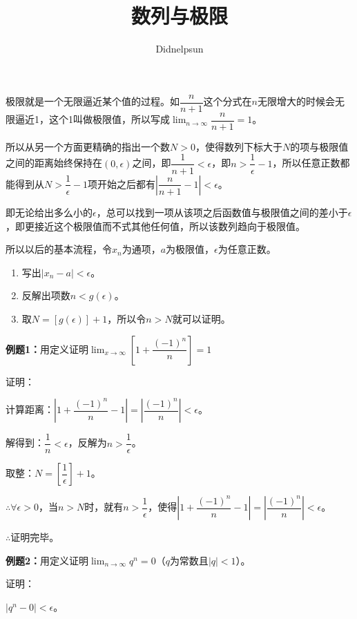 \documentclass[UTF8]{ctexart}
\author{Didnelpsun}
\title{数列与极限}
\date{}
\begin{document}
\maketitle
\thispagestyle{empty}
\tableofcontents
\thispagestyle{empty}
\newpage
\pagestyle{plain}
\setcounter{page}{1}

极限就是一个无限逼近某个值的过程。如$\dfrac{n}{n+1}$这个分式在$n$无限增大的时候会无限逼近1，这个1叫做极限值，所以写成$\lim_{n\to\infty}\dfrac{n}{n+1}=1$。

所以从另一个方面更精确的指出一个数$N>0$，使得数列下标大于$N$的项与极限值之间的距离始终保持在$(0,\epsilon)$之间，即$\dfrac{1}{n+1}<\epsilon$，即$n>\dfrac{1}{\epsilon}-1$，所以任意正数都能得到从$N>\dfrac{1}{\epsilon}-1$项开始之后都有$\left\vert\dfrac{n}{n+1}-1\right\vert<\epsilon$。

即无论给出多么小的$\epsilon$，总可以找到一项从该项之后函数值与极限值之间的差小于$\epsilon$，即更接近这个极限值而不式其他任何值，所以该数列趋向于极限值。

所以以后的基本流程，令$x_n$为通项，$a$为极限值，$\epsilon$为任意正数。

\begin{enumerate}
    \item 写出$\vert x_n-a|<\epsilon$。
    \item 反解出项数$n<g(\epsilon)$。
    \item 取$N=[g(\epsilon)]+1$，所以令$n>N$就可以证明。
\end{enumerate}

\textbf{例题1：}用定义证明$\lim_{x\to\infty}\left[1+\dfrac{(-1)^n}{n}\right]=1$

证明：

计算距离：$\left\vert 1+\dfrac{(-1)^n}{n}-1\right\vert=\left\vert\dfrac{(-1)^n}{n}\right\vert<\epsilon$。

解得到：$\dfrac{1}{n}<\epsilon$，反解为$n>\dfrac{1}{\epsilon}$。

取整：$N=\left[\dfrac{1}{\epsilon}\right]+1$。

$\therefore\forall\epsilon>0$，当$n>N$时，就有$n>\dfrac{1}{\epsilon}$，使得$\left\vert 1+\dfrac{(-1)^n}{n}-1\right\vert=\left\vert\dfrac{(-1)^n}{n}\right\vert<\epsilon$。

$\therefore$证明完毕。

\textbf{例题2：}用定义证明$\lim_{n\to\infty}q^n=0$（$q$为常数且$\vert q\vert<1$）。

证明：

$\vert q^n-0\vert<\epsilon$。
\end{document}

